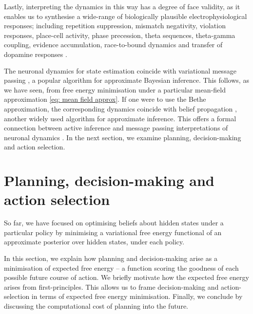 \documentclass[review,12pt,authoryear]{elsarticle}
\begin{document}
Lastly, interpreting the dynamics in this way has a degree of face validity, as it enables us to synthesise a wide-range of biologically plausible electrophysiological responses; including repetition suppression, mismatch negativity, violation responses, place-cell activity, phase precession, theta sequences, theta-gamma coupling, evidence accumulation, race-to-bound dynamics and transfer of dopamine responses \citep{schwartenbeckDopaminergicMidbrainEncodes2015,fristonActiveInferenceProcess2017}.

The neuronal dynamics for state estimation coincide with variational message passing \citep{winnVariationalMessagePassing2005,dauwelsVariationalMessagePassing2007}, a popular algorithm for approximate Bayesian inference. This follows, as we have seen, from free energy minimisation under a particular mean-field approximation \eqref{eq: mean field approx}. If one were to use the Bethe approximation, the corresponding dynamics coincide with belief propagation \citep{bishopPatternRecognitionMachine2006,loeligerIntroductionFactorGraphs2004,parrNeuronalMessagePassing2019,schwobelActiveInferenceBelief2018,yedidiaConstructingFreeEnergyApproximations2005}, another widely used algorithm for approximate inference. This offers a formal connection between active inference and message passing interpretations of neuronal dynamics \citep{fristonGraphicalBrainBelief2017,dauwelsMeasuringNeuralSynchrony2007,georgeBeliefPropagationWiring2005}. In the next section, we examine planning, decision-making and action selection.


\section{Planning, decision-making and action selection}

So far, we have focused on optimising beliefs about hidden states under a particular policy by minimising a variational free energy functional of an approximate posterior over hidden states, under each policy.

In this section, we explain how planning and decision-making arise as a minimisation of expected free energy -- a function scoring the goodness of each possible future course of action. We briefly motivate how the expected free energy arises from first-principles. This allows us to frame decision-making and action-selection in terms of expected free energy minimisation. Finally, we conclude by discussing the computational cost of planning into the future.
\end{document}
